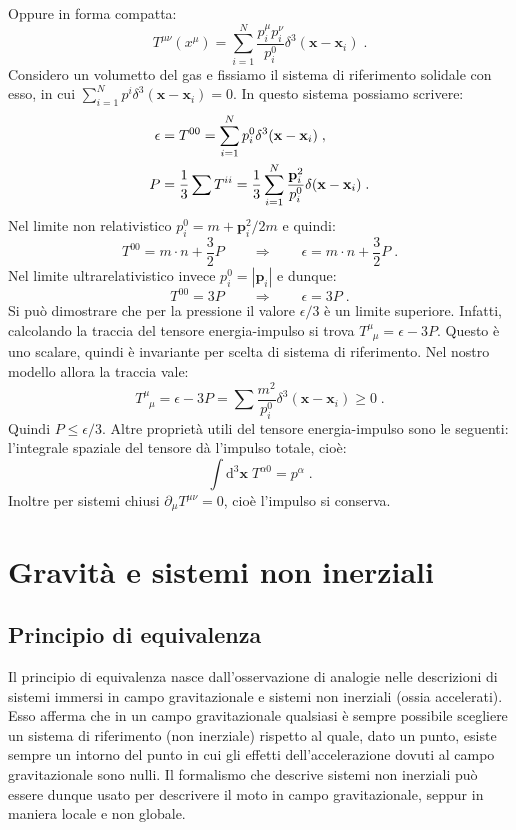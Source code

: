 \documentclass[12pt,a4paper]{report}
\theoremstyle{definition}
\newcommand{\diff}[1][]{\mathrm{d}#1}
\begin{document}
Oppure in forma compatta:
\begin{equation}
T^{\mu\nu}(x^{\mu})=\sum_{i=1}^N \frac{p_i^{\mu}p_i^{\nu}}{p_i^0}\delta^3(\mathbf{x}-\mathbf{x}_i)\;.
\end{equation}
Considero un volumetto del gas e fissiamo il sistema di riferimento solidale con esso, in cui $\sum_{i=1}^N p^i\delta^3(\mathbf{x}-\mathbf{x}_i)=0$. In questo sistema possiamo scrivere:
\begin{align}
\epsilon &= T^{00}=\sum_{i=1}^N p_i^0\delta^3(\mathbf{x}-\mathbf{x}_i)\;, \notag \\
P &= \frac{1}{3}\sum T^{ii}=\frac{1}{3}\sum_{i=1}^N \frac{\mathbf{p}_i^2}{p_i^0}\delta(\mathbf{x}-\mathbf{x}_i)\;.
\end{align}
Nel limite non relativistico $p_i^0=m+\mathbf{p}_i^2/2m$ e quindi:
$$
T^{00}=m\cdot n+\frac{3}{2}P\qquad \Longrightarrow\qquad \epsilon=m\cdot n+\frac{3}{2}P\;.
$$
Nel limite ultrarelativistico invece $p_i^0=|\mathbf{p}_i|$ e dunque:
$$
T^{00}=3P\qquad \Longrightarrow\qquad \epsilon=3P\;.
$$
Si può dimostrare che per la pressione il valore $\epsilon/3$ è un limite superiore. Infatti, calcolando la traccia del tensore energia-impulso si trova $T^{\mu}_{\;\;\mu}=\epsilon-3P$. Questo è uno scalare, quindi è invariante per scelta di sistema di riferimento. Nel nostro modello allora la traccia vale:
$$
T^{\mu}_{\;\;\mu}=\epsilon-3P=\sum\frac{m^2}{p_i^0}\delta^3(\mathbf{x}-\mathbf{x}_i)\ge 0\;.
$$
Quindi $P\le \epsilon/3$. Altre proprietà utili del tensore energia-impulso sono le seguenti: l'integrale spaziale del tensore dà l'impulso totale, cioè:
\begin{equation}
\int \diff^3{\mathbf{x}}\; T^{\alpha 0}=p^{\alpha}\;.
\end{equation}
Inoltre per sistemi chiusi $\partial_{\mu}T^{\mu\nu}=0$, cioè l'impulso si conserva.

\chapter{Gravità e sistemi non inerziali}
\section{Principio di equivalenza}
Il principio di equivalenza nasce dall'osservazione di analogie nelle descrizioni di sistemi immersi in campo gravitazionale e sistemi non inerziali (ossia accelerati). Esso afferma che in un campo gravitazionale qualsiasi è sempre possibile scegliere un sistema di riferimento (non inerziale) rispetto al quale, dato un punto, esiste sempre un intorno del punto in cui gli effetti dell'accelerazione dovuti al campo gravitazionale sono nulli. Il formalismo che descrive sistemi non inerziali può essere dunque usato per descrivere il moto in campo gravitazionale, seppur in maniera locale e non globale.
\end{document}
